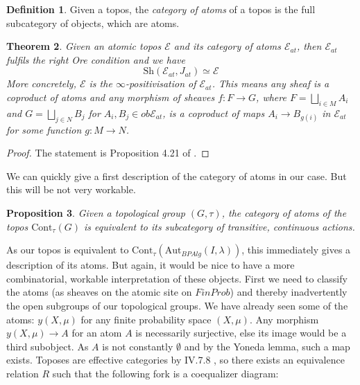 \documentclass[a4paper]{amsproc}
\theoremstyle{plain}
\newtheorem{theorem}{Theorem}[section]
\newtheorem{proposition}[theorem]{Proposition}
\theoremstyle{definition}
\newtheorem{definition}[theorem]{Definition}
\theoremstyle{remark}
\numberwithin{equation}{section}
\begin{document}
\begin{definition} Given a topos, the \emph{category of atoms} of a topos is the full subcategory of objects, which are atoms.
\end{definition}
\begin{theorem}
Given an atomic topos $\mathcal{E}$ and its category of atoms $\mathcal{E}_{at}$, then $\mathcal{E}_{at}$ fulfils the right Ore condition and we have
\[\text{Sh}(\mathcal{E}_{at},J_{at})\simeq \mathcal{E} \]
More concretely, $\mathcal{E}$ is the $\infty$-positivisation of $\mathcal{E}_{at}$. This means any sheaf is a coproduct of atoms and any morphism of sheaves $f: F\rightarrow G$, where $F=\bigsqcup_{i\in M} A_i$ and $G=\bigsqcup_{j\in N} B_j$ for $A_i,B_j\in ob\mathcal{E}_{at}$, is a coproduct of maps $A_i\rightarrow B_{g(i)}$ in $\mathcal{E}_{at}$ for some function $g:M\rightarrow N$.
\end{theorem}
\begin{proof}
The statement is Proposition 4.21 of \cite{caramello}. %
\end{proof}
We can quickly give a first description of the category of atoms in our case. But this will be not very workable.
\begin{proposition} Given a topological group $(G,\tau)$, the category of atoms of the topos $\text{Cont}_\tau (G)$ is equivalent to its subcategory of transitive, continuous actions. \cite{XYZ}
\end{proposition}
As our topos is equivalent to $\text{Cont}_\tau(\text{Aut}_{BPAlg}(I,\lambda))$, this immediately gives a description of its atoms.
But again, it would be nice to have a more combinatorial, workable interpretation of these objects. First we need to classify the atoms (as sheaves on the atomic site on $FinProb$) and thereby inadvertently the open subgroups of our topological groups.
\newline
\indent We have already seen some of the atoms: $y(X,\mu)$ for any finite probability space $(X,\mu)$. Any morphism $y(X,\mu)\rightarrow A$ for an atom $A$ is necessarily surjective, else its image would be a third subobject. As $A$ is not constantly $\emptyset$ and by the Yoneda lemma, such a map exists. Toposes are effective categories by IV.7.8 \cite{sheaves_geometry_logic}, so there exists an equivalence relation $R$ such that the following fork is a coequalizer diagram:
\begin{center}

\end{center}
\end{document}
